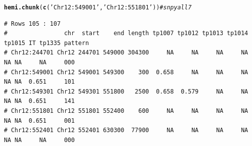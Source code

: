 \documentclass{article}\usepackage[]{graphicx}\usepackage[]{color}
\makeatletter
\newcommand{\hlstr}[1]{\textcolor[rgb]{0.192,0.494,0.8}{#1}}%
\newcommand{\hlcom}[1]{\textcolor[rgb]{0.678,0.584,0.686}{\textit{#1}}}%
\newcommand{\hlstd}[1]{\textcolor[rgb]{0.345,0.345,0.345}{#1}}%
\newcommand{\hlkwd}[1]{\textcolor[rgb]{0.737,0.353,0.396}{\textbf{#1}}}%
\newenvironment{kframe}{%
 \def\at@end@of@kframe{}%
 \ifinner\ifhmode%
  \def\at@end@of@kframe{\end{minipage}}%
  \begin{minipage}{\columnwidth}%
 \fi\fi%
 \def\FrameCommand##1{\hskip\@totalleftmargin \hskip-\fboxsep
 \colorbox{shadecolor}{##1}\hskip-\fboxsep
     \hskip-\linewidth \hskip-\@totalleftmargin \hskip\columnwidth}%
 \MakeFramed {\advance\hsize-\width
   \@totalleftmargin\z@ \linewidth\hsize
   \@setminipage}}%
 {\par\unskip\endMakeFramed%
 \at@end@of@kframe}
\newenvironment{knitrout}{}{} %
\makeatother
\begin{document}
\begin{knitrout}\footnotesize
{}\color{fgcolor}\begin{kframe}
\begin{alltt}
\hlkwd{hemi.chunk}\hlstd{(}\hlkwd{c}\hlstd{(}\hlstr{'Chr12:549001'}\hlstd{,}\hlstr{'Chr12:551801'}\hlstd{))} \hlcom{# snpy all 7}
\end{alltt}
\begin{verbatim}
# Rows 105 : 107 
#                chr  start    end length tp1007 tp1012 tp1013 tp1014 tp1015 IT tp1335 pattern
# Chr12:244701 Chr12 244701 549000 304300     NA     NA     NA     NA     NA NA     NA     000
# Chr12:549001 Chr12 549001 549300    300  0.658     NA     NA     NA     NA NA  0.651     101
# Chr12:549301 Chr12 549301 551800   2500  0.658  0.579     NA     NA     NA NA  0.651     141
# Chr12:551801 Chr12 551801 552400    600     NA     NA     NA     NA     NA NA  0.651     001
# Chr12:552401 Chr12 552401 630300  77900     NA     NA     NA     NA     NA NA     NA     000
\end{verbatim}
\end{kframe}


\end{knitrout}
\end{document}
